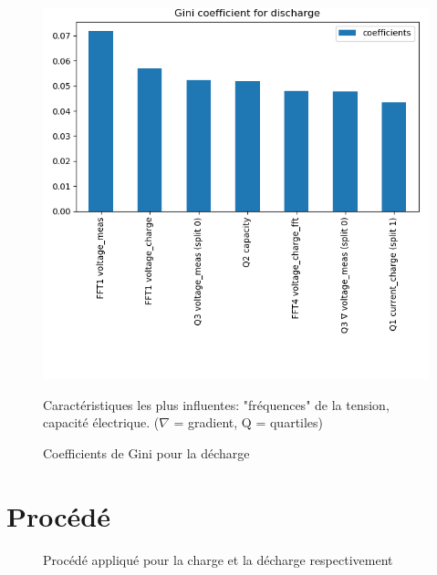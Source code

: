 \begin{figure}[h!]
    \centering
    \includegraphics[scale=0.6]{images/rf/gini_discharge.png}
    \caption{Coefficients de Gini pour la décharge}
    \label{fig:GiniDisharge}
    \begin{center}
    Caractéristiques les plus influentes: "fréquences" de la tension, capacité électrique. ($\nabla$ = gradient, Q = quartiles)
    \end{center}
\end{figure}

\clearpage

\section{Procédé}

\begin{figure}[h!]
    \centering
    \caption{Procédé appliqué pour la charge et la décharge respectivement}
    \label{fig:RFProcess}
\end{figure}

